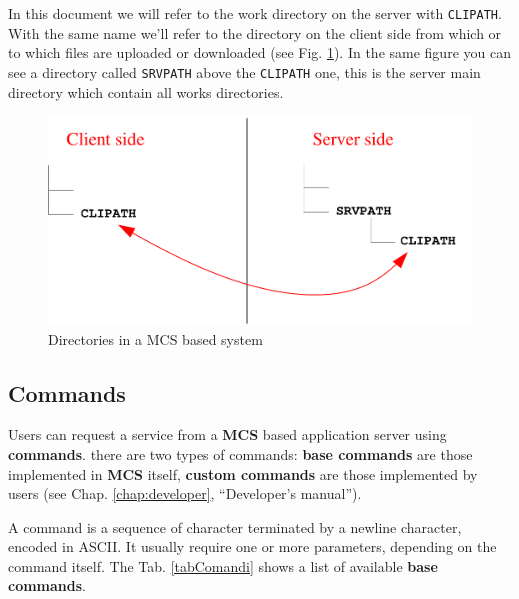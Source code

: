 \documentclass[12pt,titlepage]{book}
\newcommand{\mcs}{\textbf{MCS} }
\begin{document}
\noindent In this document we will refer to the work directory on the
server with \verb|CLIPATH|. With the same name we'll refer to the
directory on the client side from which or to which files are uploaded
or downloaded (see Fig. \ref{fig:dirs}). In the same figure you can
see a directory called \verb|SRVPATH| above the \verb|CLIPATH| one,
this is the server main directory which contain all works directories.

%
\begin{figure}[hbtp]
\begin{center}
\includegraphics[width=14cm,keepaspectratio]{includes/dirs}
\end{center}
\caption{Directories in a MCS based system}
\label{fig:dirs}
\end{figure}
%






\subsection{Commands}
\label{sec:commands}
Users can request a service from a \mcs based application server using
\textbf{commands}. there are two types of commands: \textbf{base
commands} are those implemented in \mcs itself, \textbf{custom
commands} are those implemented by users (see
Chap. \ref{chap:developer}, ``Developer's manual'').

\noindent A command is a sequence of character terminated by a newline
character, encoded in ASCII. It usually require one or more parameters,
depending on the command itself. The Tab. \ref{tabComandi} shows a
list of available \textbf{base commands}.
\end{document}
